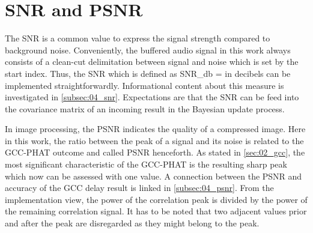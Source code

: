 \section{SNR and PSNR}
\label{sec:03_snr}

The \acf{SNR} is a common value to express the signal strength compared
to background noise.
Conveniently, the buffered audio signal in this work always consists of
a clean-cut delimitation between signal and noise which is set by the
start index.
Thus, the \ac{SNR} which is defined as
\bal
    SNR_{db} = 
    \label{eq:03_snr}
\eal
in decibels can be implemented straightforwardly.
Informational content about this measure is investigated in \cref{subsec:04_snr}.
Expectations are that the \ac{SNR} can be feed into the covariance matrix
of an incoming result in the Bayesian update process.

In image processing, the \acf{PSNR} indicates the quality of a compressed
image. Here in this work, the ratio between the peak of a signal
and its noise is related to the \ac{GCC-PHAT} outcome and called \ac{PSNR}
henceforth.
As stated in \cref{sec:02_gcc}, the most significant characteristic
of the \ac{GCC-PHAT} is the resulting sharp peak which now can be
assessed with one value.
A connection between the \ac{PSNR} and accuracy of the \ac{GCC} delay result
is linked in \cref{subsec:04_psnr}.
From the implementation view, the power of the correlation peak is divided by
the power of the remaining correlation signal.
It has to be noted that two adjacent values prior and after the peak
are disregarded as they might belong to the peak.

